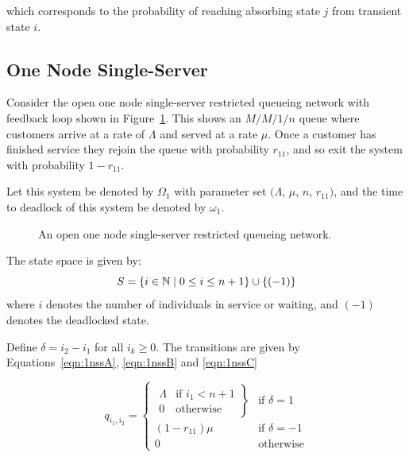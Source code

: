 \documentclass{article}
\numberwithin{equation}{section}
\begin{document}
which corresponds to the probability of reaching absorbing state $j$ from transient state $i$.


\subsection{One Node Single-Server}\label{sec:1nodenet}

Consider the open one node single-server restricted queueing network with feedback loop shown in Figure~\ref{fig:queueingnetwork_1node}.
This shows an \(M/M/1/n\) queue where customers arrive at a rate of $\Lambda$ and served at a rate $\mu$.
Once a customer has finished service they rejoin the queue with probability $r_{11}$, and so exit the system with probability $1 - r_{11}$.

Let this system be denoted by $\Omega_1$ with parameter set $(\Lambda$, $\mu$, $n$, $r_{11})$, and the time to deadlock of this system be denoted by $\omega_1$.

\begin{figure}[!htbp]
  \begin{center}
  
  \end{center}
  \caption{An open one node single-server restricted queueing network.}
  \label{fig:queueingnetwork_1node}
\end{figure}

The state space is given by:
        \[S = \{i\in\mathbb{N} \nonscript\; | \nonscript\; 0 \leq i \leq n + 1
        \}\cup\{(-1)\}\]
where \(i\) denotes the number of individuals in service or waiting, and $(-1)$ denotes the deadlocked state.

Define $\delta = i_2 - i_1$ for all $i_k \geq 0$. The transitions are given by Equations~\ref{eqn:1nssA}, \ref{eqn:1nssB} and \ref{eqn:1nssC}

\begin{equation}\label{eqn:1nssA}
  q_{i_1, i_2} = \left\{
  \begin{array}{rr}
    \left. \begin{array}{rr}
      \Lambda & \text{if } i_1 < n + 1 \\
      0 & \text{otherwise}
    \end{array} \right\} & \text{if } \delta = 1 \\
    (1 - r_{11})\mu & \text{if } \delta = -1 \\
    0 & \text{otherwise}
  \end{array} \right.
\end{equation}
\end{document}
